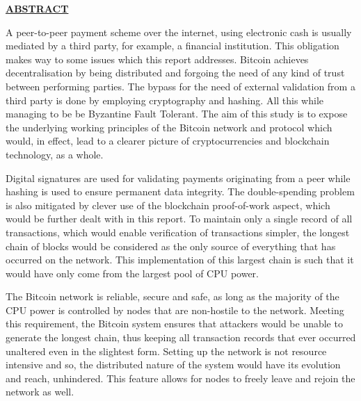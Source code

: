 \documentclass[12pt,a4paper]{report}
\begin{document}
\newpage
\begin{center}\underline{ \Large \textbf{ABSTRACT}}\end{center}
\vspace{5mm}
 \begin{flushleft}
 A peer-to-peer payment scheme over the internet, using electronic cash is usually mediated by a third party, for example, a financial institution. This obligation makes way to some issues which this report addresses. Bitcoin achieves decentralisation by being distributed and forgoing the need of any kind of trust between performing parties. The bypass for the need of external validation from a third party is done by employing cryptography and hashing. All this while managing to be be Byzantine Fault Tolerant. The aim of this study is to expose the underlying working principles of the Bitcoin  network and protocol which would, in effect, lead to a clearer picture of cryptocurrencies and blockchain technology, as a whole.
 \vspace{5mm}
  
 Digital signatures are used for validating payments originating from a peer while hashing is used to ensure permanent data integrity. The double-spending problem is also mitigated by clever use of the blockchain proof-of-work aspect, which would be further dealt with in this report. To maintain only a single record of all transactions, which would enable verification of transactions simpler, the longest chain of blocks would be considered as the only source of everything that has occurred on the network. This implementation of this largest chain is such that it would have only come from the largest pool of CPU power.
  \vspace{5mm}
  
 The Bitcoin network is reliable, secure and safe, as long as the majority of the CPU power is controlled by nodes that are non-hostile to the network. Meeting this requirement, the Bitcoin system ensures that attackers would be unable to generate the longest chain, thus keeping all transaction records that ever occurred unaltered even in the slightest form. Setting up the network is not resource intensive and so, the distributed nature of the system would have its evolution and reach, unhindered. This feature allows for nodes to freely leave and rejoin the network as well.
 \vspace{10mm} 
 


\end{flushleft}
\end{document}
